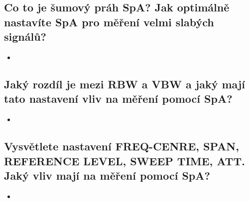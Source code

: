 \documentclass[a4paper]{article}
\begin{document}
\subsection{\textbf{Co to je šumový práh SpA? Jak optimálně nastavíte SpA pro měření velmi slabých signálů?}}
\begin{itemize}
	\item
\end{itemize}
\subsection{\textbf{Jaký rozdíl je mezi RBW a VBW a jaký mají tato nastavení vliv na měření pomocí SpA?}}
\begin{itemize}
	\item
\end{itemize}
\subsection{\textbf{Vysvětlete nastavení FREQ-CENRE, SPAN, REFERENCE LEVEL, SWEEP TIME, ATT. Jaký vliv mají na měření pomocí SpA?}}
\begin{itemize}
	\item
\end{itemize}
\end{document}
